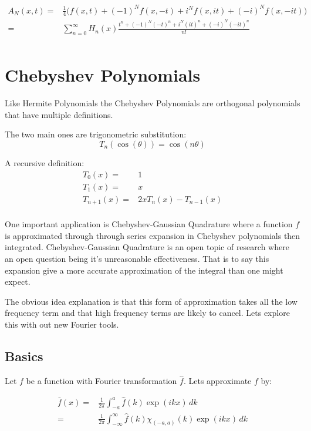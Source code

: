 \begin{equation*}
\begin{aligned}
A_N(x,t) =& \frac{1}{4}\big(f(x,t)+(-1)^Nf(x,-t)+i^Nf(x,it)+(-i)^Nf(x,-it)\big)\\
=& \sum_{n=0}^\infty H_n(x)\frac{t^n+(-1)^N(-t)^n+i^N(it)^n+(-i)^N(-it)^n}{n!} \\
\end{aligned}
\end{equation*}

\section{Chebyshev Polynomials}
Like Hermite Polynomials the Chebyshev Polynomials are orthogonal polynomials that have multiple definitions.

The two main ones are trigonometric substitution:
\[T_n(\cos(\theta)) = \cos(n\theta)\]

A recursive definition:
\begin{equation*}
\begin{aligned}
	T_0(x) =& 1 \\
	T_1(x) =& x \\
	T_{n+1}(x) =& 2xT_n(x) - T_{n-1}(x)\\
\end{aligned}
\end{equation*}

One important application is Chebyshev-Gaussian Quadrature where a function $f$ is approximated through through series expansion in Chebyshev polynomials then integrated.
Chebyshev-Gaussian Quadrature is an open topic of research where an open question being it's unreasonable effectiveness.
That is to say this expansion give a more accurate approximation of the integral than one might expect.

The obvious idea explanation is that this form of approximation takes all the low frequency term and that high frequency terms are likely to cancel.
Lets explore this with out new Fourier tools.

\subsection{Basics}
Let $f$ be a function with Fourier transformation $\hat{f}$.
Lets approximate $f$ by:

\begin{equation*}
\begin{aligned}
\bar{f}(x) =& \frac{1}{2\pi}  \int_{-a}^{a}\hat{f}(k)\exp(ikx)\,dk\\
=& \frac{1}{2\pi}  \int_{-\infty}^{\infty}\hat{f}(k)\chi_{(-a,a)}(k)\exp(ikx)\,dk\\
\end{aligned}
\end{equation*}

